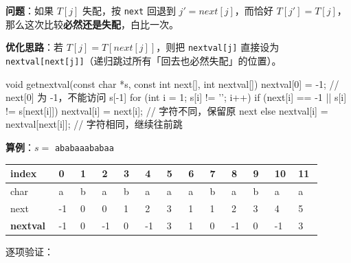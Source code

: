 \documentclass[11pt,openany,UTF8]{ctexbook}
\begin{document}
\textbf{问题}：如果 $T[j]$ 失配，按 \texttt{next} 回退到 $j'=next[j]$，而恰好 $T[j']=T[j]$，那么这次比较\textbf{必然还是失配}，白比一次。

\textbf{优化思路}：若 $T[j]=T[next[j]]$，则把 \texttt{nextval[j]\allowbreak{}} 直接设为 \texttt{nextval[next[j]\allowbreak{}]\allowbreak{}}（递归跳过所有「回去也必然失配」的位置）。

\begin{codebox}
void getnextval(const char *s, const int next[], int nextval[]) {
    nextval[0] = -1;                     // next[0] 为 -1，不能访问 s[-1]
    for (int i = 1; s[i] != '\0'; i++) {
        if (next[i] == -1 || s[i] != s[next[i]])
            nextval[i] = next[i];        // 字符不同，保留原 next
        else
            nextval[i] = nextval[next[i]]; // 字符相同，继续往前跳
    }
}
\end{codebox}

\textbf{算例}：$s=$ \texttt{ababaaababaa}

\begingroup\footnotesize\setlength{\tabcolsep}{1.5pt}
\begin{longtable}{@{}L{0.0846\linewidth}L{0.0676\linewidth}L{0.0676\linewidth}L{0.0676\linewidth}L{0.0676\linewidth}L{0.0676\linewidth}L{0.0676\linewidth}L{0.0676\linewidth}L{0.0676\linewidth}L{0.0676\linewidth}L{0.0676\linewidth}L{0.0676\linewidth}L{0.0676\linewidth}@{}}
\toprule
\textbf{index} & \textbf{0} & \textbf{1} & \textbf{2} & \textbf{3} & \textbf{4} & \textbf{5} & \textbf{6} & \textbf{7} & \textbf{8} & \textbf{9} & \textbf{10} & \textbf{11} \\
\midrule
\endhead
char & a & b & a & b & a & a & a & b & a & b & a & a \\
next & -1 & 0 & 0 & 1 & 2 & 3 & 1 & 1 & 2 & 3 & 4 & 5 \\
\textbf{nextval} & -1 & 0 & -1 & 0 & -1 & 3 & 1 & 0 & -1 & 0 & -1 & 3 \\
\bottomrule
\end{longtable}
\endgroup

逐项验证：
\end{document}
